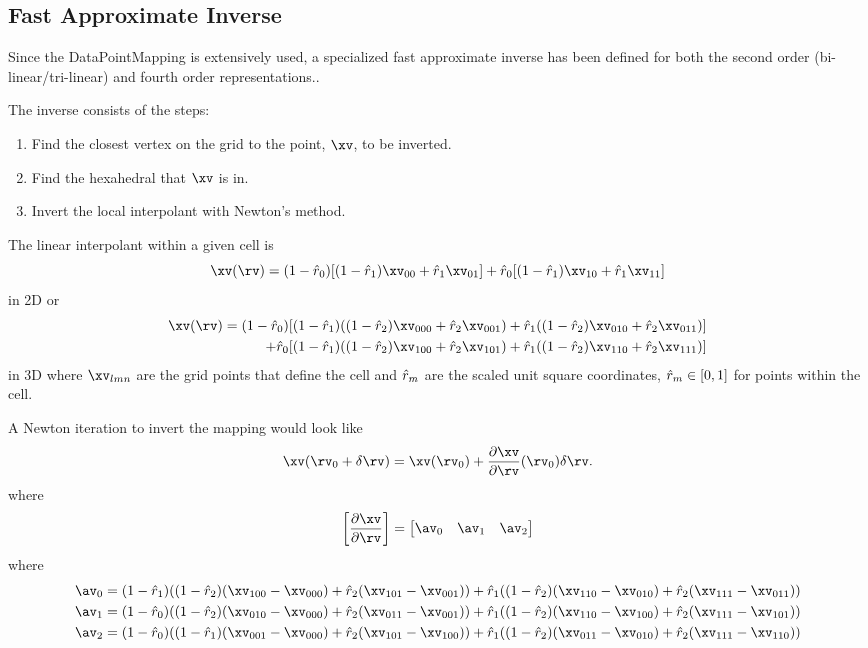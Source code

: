 \subsection{Fast Approximate Inverse}

 Since the DataPointMapping is extensively used, a specialized fast approximate
inverse has been defined for both the second order (bi-linear/tri-linear) and
fourth order representations..

The inverse consists of the steps:
\begin{enumerate}
  \item Find the closest vertex on the grid to the point, $\xv$, to be inverted.
  \item Find the hexahedral that $\xv$ is in.
  \item Invert the local interpolant with Newton's method.
\end{enumerate}


The linear interpolant within a given cell is
\[
   \xv(\rv) = (1-\rh_0) [ (1-\rh_1)\xv_{00} + \rh_1\xv_{01} ]
            +    \rh_0  [ (1-\rh_1)\xv_{10} + \rh_1\xv_{11} ]
\]
in 2D or
\begin{align*}
   \xv(\rv) = (1-\rh_0) &[ (1-\rh_1)((1-\rh_2)\xv_{000}+\rh_2\xv_{001}) + \rh_1((1-\rh_2)\xv_{010}+\rh_2\xv_{011}) ] \\
             +    \rh_0  &[ (1-\rh_1)((1-\rh_2)\xv_{100}+\rh_2\xv_{101}) + \rh_1((1-\rh_2)\xv_{110}+\rh_2\xv_{111}) ]
\end{align*}
in 3D where $\xv_{lmn}$ are the grid points that define the cell and $\hat{r}_m$ are the scaled unit square coordinates,
$\hat{r}_m \in [0,1]$ for points within the cell.


A Newton iteration to invert the mapping would look like
\[
  \xv(\rv_0+\delta\rv) = \xv(\rv_0) + {\partial \xv \over \partial \rv }(\rv_0) \delta \rv.
\]
where
\[
  \left[ \partial \xv \over \partial \rv \right] =
   \begin{bmatrix}
      \av_0 & \av_1 & \av_2
   \end{bmatrix}
\]
where
\begin{align*}
  \av_0 & = (1-\rh_1)((1-\rh_2)(\xv_{100}-\xv_{000})+\rh_2(\xv_{101}-\xv_{001})) 
        + \rh_1((1-\rh_2)(\xv_{110}-\xv_{010})+\rh_2(\xv_{111}-\xv_{011}))      \\
  \av_1 &=(1-\rh_0)((1-\rh_2)(\xv_{010}-\xv_{000})+\rh_2(\xv_{011}-\xv_{001})) 
       + \rh_1((1-\rh_2)(\xv_{110}-\xv_{100})+\rh_2(\xv_{111}-\xv_{101}))       \\
  \av_2 &=  (1-\rh_0)((1-\rh_1)(\xv_{001}-\xv_{000})+\rh_2(\xv_{101}-\xv_{100})) 
       + \rh_1((1-\rh_2)(\xv_{011}-\xv_{010})+\rh_2(\xv_{111}-\xv_{110})) 
\end{align*}

